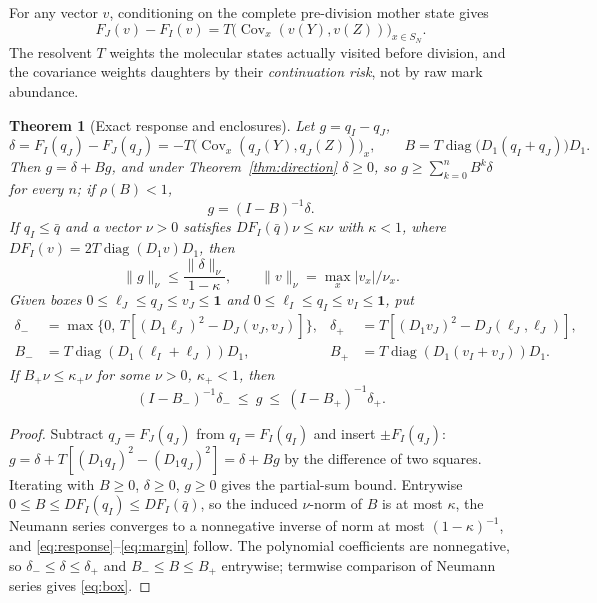 \documentclass[11pt]{article}
\newtheorem{theorem}{Theorem}
\theoremstyle{remark}
\newcommand{\one}{\mathbf 1}
\newcommand{\diag}{\operatorname{diag}}
\newcommand{\Cov}{\operatorname{Cov}}
\begin{document}
For any vector $v$, conditioning on the complete pre-division mother state
gives
\begin{equation}\label{eq:forcing}
 F_J(v)-F_I(v)=T\bigl(\Cov_x(v(Y),v(Z))\bigr)_{x\in S_N}.
\end{equation}
The resolvent $T$ weights the molecular states actually visited before
division, and the covariance weights daughters by their \emph{continuation
risk}, not by raw mark abundance.

\begin{theorem}[Exact response and enclosures]\label{thm:response}
Let $g=q_I-q_J$,
\[
 \delta=F_I(q_J)-F_J(q_J)=-T\bigl(\Cov_x(q_J(Y),q_J(Z))\bigr)_x,\qquad
 B=T\diag\bigl(D_1(q_I+q_J)\bigr)D_1 .
\]
Then $g=\delta+Bg$, and under Theorem~\ref{thm:direction} $\delta\ge0$, so
$g\ge\sum_{k=0}^nB^k\delta$ for every $n$; if $\rho(B)<1$,
\begin{equation}\label{eq:response}
 g=(I-B)^{-1}\delta .
\end{equation}
If $q_I\le\bar q$ and a vector $\nu>0$ satisfies
$DF_I(\bar q)\nu\le\kappa\nu$ with $\kappa<1$, where
$DF_I(v)=2T\diag(D_1v)D_1$, then
\begin{equation}\label{eq:margin}
 \|g\|_\nu\le\frac{\|\delta\|_\nu}{1-\kappa},\qquad \|v\|_\nu=\max_x|v_x|/\nu_x .
\end{equation}
Given boxes $0\le\ell_J\le q_J\le v_J\le\one$ and
$0\le\ell_I\le q_I\le v_I\le\one$, put
\begin{align*}
 \delta_-&=\max\{0,\,T[(D_1\ell_J)^2-D_J(v_J,v_J)]\},&
 \delta_+&=T[(D_1v_J)^2-D_J(\ell_J,\ell_J)],\\
 B_-&=T\diag(D_1(\ell_I+\ell_J))D_1,&B_+&=T\diag(D_1(v_I+v_J))D_1 .
\end{align*}
If $B_+\nu\le\kappa_+\nu$ for some $\nu>0$, $\kappa_+<1$, then
\begin{equation}\label{eq:box}
 (I-B_-)^{-1}\delta_-\ \le\ g\ \le\ (I-B_+)^{-1}\delta_+ .
\end{equation}
\end{theorem}
\begin{proof}
Subtract $q_J=F_J(q_J)$ from $q_I=F_I(q_I)$ and insert $\pm F_I(q_J)$:
$g=\delta+T[(D_1q_I)^2-(D_1q_J)^2]=\delta+Bg$ by the difference of two
squares. Iterating with $B\ge0$, $\delta\ge0$, $g\ge0$ gives the partial-sum
bound. Entrywise $0\le B\le DF_I(q_I)\le DF_I(\bar q)$, so the induced
$\nu$-norm of $B$ is at most $\kappa$, the Neumann series converges to a
nonnegative inverse of norm at most $(1-\kappa)^{-1}$, and
\eqref{eq:response}--\eqref{eq:margin} follow. The polynomial coefficients
are nonnegative, so $\delta_-\le\delta\le\delta_+$ and $B_-\le B\le B_+$
entrywise; termwise comparison of Neumann series gives \eqref{eq:box}.
\end{proof}
\end{document}
